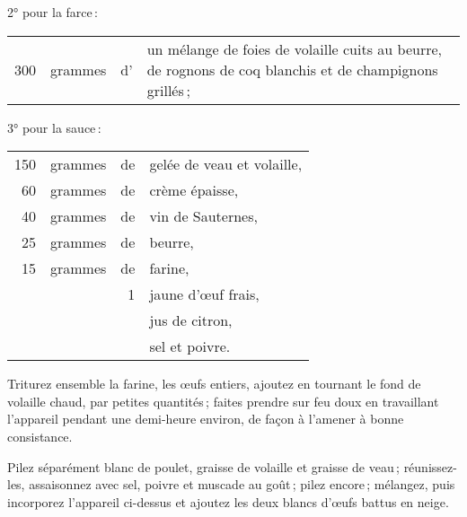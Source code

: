 \smallskip

2° pour la farce :

\smallskip

\footnotesize
\begin{longtable}{rrrp{16em}}
    300 & grammes & d' & un mélange de foies de volaille cuits au beurre,
                         de rognons de coq blanchis et de champignons grillés ;                           \\
\end{longtable}
\normalsize

3° pour la sauce :

\medskip

\footnotesize
\begin{longtable}{rrrp{16em}}
    150 & grammes & de & gelée de veau et volaille,                                                       \\
     60 & grammes & de & crème épaisse,                                                                   \\
     40 & grammes & de & vin de Sauternes,                                                                \\
     25 & grammes & de & beurre,                                                                          \\
     15 & grammes & de & farine,                                                                          \\
        &         &  1 & jaune d'œuf frais,                                                               \\
        &         &    & jus de citron,                                                                   \\
        &         &    & sel et poivre.                                                                   \\
\end{longtable}
\normalsize

Triturez ensemble la farine, les œufs entiers, ajoutez en tournant le fond de
volaille chaud, par petites quantités ; faites prendre sur feu doux en
travaillant l'appareil pendant une demi-heure environ, de façon à l’amener
à bonne consistance.

Pilez séparément blanc de poulet, graisse de volaille et graisse de veau ;
réunissez-les, assaisonnez avec sel, poivre et muscade au goût ; pilez encore ;
mélangez, puis incorporez l'appareil ci-dessus et ajoutez les deux blancs
d'œufs battus en neige.

